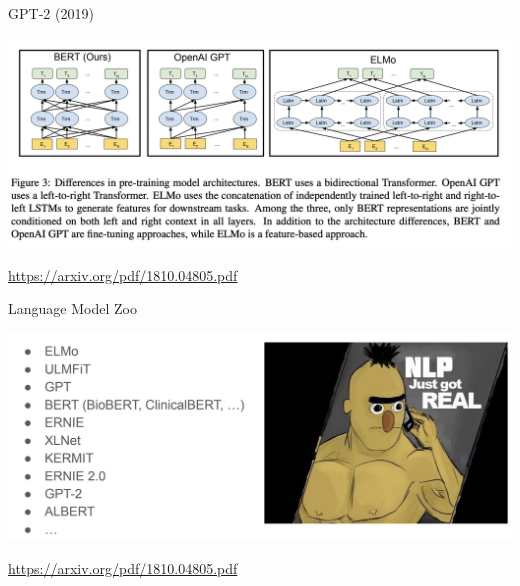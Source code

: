 \documentclass[notes,12pt, aspectratio=169]{beamer}
\begin{document}
\begin{frame}{GPT-2 (2019)}
	\begin{center}
		\includegraphics[width=.99\linewidth]{bert.png}
	\end{center}
	\vfill
	\footnotesize
	{\color{blue} \url{https://arxiv.org/pdf/1810.04805.pdf}}
\end{frame}


\begin{frame}{Language Model Zoo}
	\begin{center}
		\includegraphics[width=.99\linewidth]{lang_zoo.png}
	\end{center}
	\vfill
	\footnotesize
	{\color{blue} \url{https://arxiv.org/pdf/1810.04805.pdf}}
\end{frame}
\end{document}
